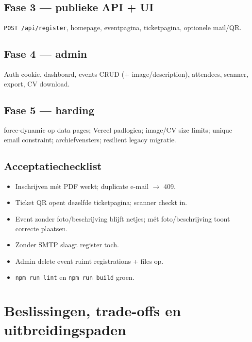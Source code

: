 \documentclass[11pt,a4paper]{report}
\begin{document}
\section{Fase 3 --- publieke API + UI}
\texttt{POST /api/register}, homepage, eventpagina, ticketpagina, optionele mail/QR.

\section{Fase 4 --- admin}
Auth cookie, dashboard, events CRUD (+ image/description), attendees, scanner, export, CV download.

\section{Fase 5 --- harding}
force-dynamic op data pages; Vercel padlogica; image/CV size limits; unique email constraint;
archiefvensters; resilient legacy migratie.

\section{Acceptatiechecklist}
\begin{itemize}[leftmargin=*]
  \item Inschrijven mét PDF werkt; duplicate e-mail $\to$ 409.
  \item Ticket QR opent dezelfde ticketpagina; scanner checkt in.
  \item Event zonder foto/beschrijving blijft netjes; mét foto/beschrijving toont correcte plaatsen.
  \item Zonder SMTP slaagt register toch.
  \item Admin delete event ruimt registrations + files op.
  \item \texttt{npm run lint} en \texttt{npm run build} groen.
\end{itemize}

\chapter{Beslissingen, trade-offs en uitbreidingspaden}
\end{document}

